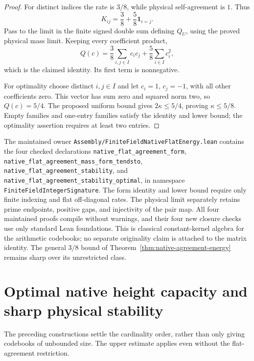 \documentclass[11pt]{article}
\begin{document}
\begin{proof}
For distinct indices the rate is \(3/8\), while physical
self-agreement is \(1\). Thus
\[
 K_{ij}=\frac38+\frac58\mathbf 1_{i=j}.
\]
Pass to the limit in the finite signed double sum defining \(Q_U\),
using the proved physical mass limit. Keeping every coefficient product,
\[
 Q(c)=\frac38\sum_{i,j\in I}c_ic_j+\frac58\sum_{i\in I}c_i^2,
\]
which is the claimed identity. Its first term is nonnegative.

For optimality choose distinct \(i,j\in I\) and let \(c_i=1\),
\(c_j=-1\), with all other coefficients zero. This vector has
sum zero and squared norm two, so \(Q(c)=5/4\).
The proposed uniform bound gives \(2\kappa\le5/4\), proving
\(\kappa\le5/8\). Empty families and one-entry families satisfy
the identity and lower bound; the optimality assertion requires
at least two entries.
\end{proof}

The maintained owner
\texttt{Assembly/\allowbreak FiniteFieldNativeFlatEnergy.\allowbreak lean}
contains the four checked declarations
\texttt{native\_flat\_agreement\_form},
\texttt{native\_flat\_agreement\_mass\_form\_tendsto},
\texttt{native\_flat\_agreement\_stability}, and
\texttt{native\_flat\_agreement\_stability\_optimal}, in namespace
\texttt{FiniteFieldIntegerSignature}.
The form identity and lower bound require only finite indexing and
flat off-diagonal rates. The physical limit separately retains prime
endpoints, positive gaps, and injectivity of the pair map.
All four maintained proofs compile without warnings, and their four
new closure checks use only standard Lean foundations.
This is classical constant-kernel algebra for the arithmetic codebooks;
no separate originality claim is attached to the matrix identity.
The general \(3/8\) bound of
Theorem~\ref{thm:native-agreement-energy} remains sharp over its
unrestricted class.

\section{Optimal native height capacity and sharp physical stability}

The preceding constructions settle the cardinality order, rather than
only giving codebooks of unbounded size. The upper estimate applies even
without the flat-agreement restriction.
\end{document}
